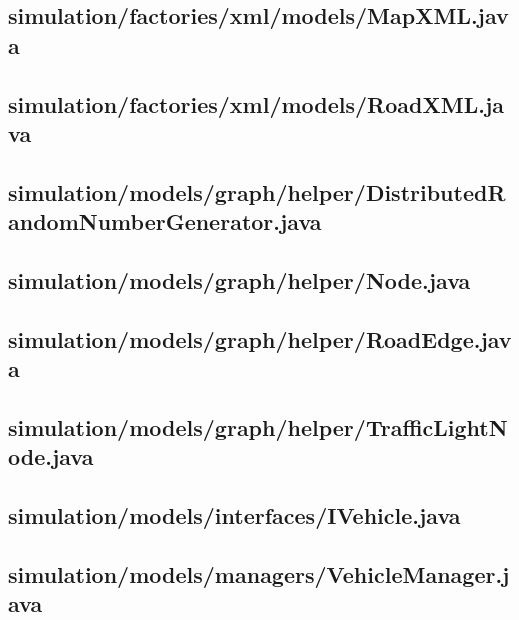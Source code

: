 \subsection{simulation/factories/xml/models/MapXML.java}

\newpage
\subsection{simulation/factories/xml/models/RoadXML.java}

\newpage
\subsection{simulation/models/graph/helper/DistributedRandomNumberGenerator.java}

\newpage
\subsection{simulation/models/graph/helper/Node.java}

\newpage
\subsection{simulation/models/graph/helper/RoadEdge.java}

\newpage
\subsection{simulation/models/graph/helper/TrafficLightNode.java}

\newpage
\subsection{simulation/models/interfaces/IVehicle.java}

\newpage
\subsection{simulation/models/managers/VehicleManager.java}

\newpage
